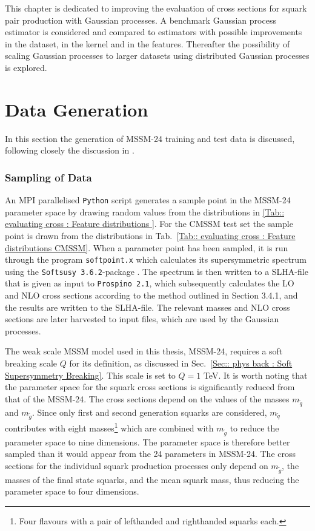 \documentclass[twoside,english]{uiofysmaster}
\begin{document}
{{This chapter is dedicated to improving the evaluation of cross sections for squark pair production with Gaussian processes. A benchmark Gaussian process estimator is considered and compared to estimators with possible improvements in the dataset, in the kernel and in the features. Thereafter the possibility of scaling Gaussian processes to larger datasets using distributed Gaussian processes is explored.

\section{Data Generation}

In this section the generation of MSSM-24 training and test data is discussed, following closely the discussion in \cite{sparre2018fast}. 

\subsubsection{Sampling of Data}

An MPI parallelised \verb|Python| script generates a sample point in the MSSM-24 parameter space by drawing random values from the distributions in \autoref{Tab:: evaluating cross : Feature distributions }. For the CMSSM test set the sample point is drawn from the distributions in Tab.~\ref{Tab:: evaluating cross : Feature distributions CMSSM}. When a parameter point has been sampled, it is run through the program \verb|softpoint.x| which calculates its supersymmetric spectrum using the \verb|Softsusy 3.6.2|-package \cite{ALLANACH2002305}. The spectrum is then written to a SLHA-file \cite{skands2004susy} that is given as input to \verb|Prospino 2.1|, which subsequently calculates the LO and NLO cross sections according to the method outlined in Section 3.4.1, and the results are written to the SLHA-file. The relevant masses and NLO cross sections are later harvested to input files, which are used by the Gaussian processes. 

The weak scale MSSM model used in this thesis, MSSM-24, requires a soft breaking scale $Q$ for its definition, as discussed in Sec.~\ref{Sec:: phys back : Soft Supersymmetry Breaking}. This scale is set to $Q=1$ TeV. It is worth noting that the parameter space for the squark cross sections is significantly reduced from that of the MSSM-24. The cross sections depend on the values of the masses $m_{\widetilde{q}}$ and $m_{\widetilde{g}}$. Since only first and second generation squarks are considered, $m_{\widetilde{q}}$ contributes with eight masses\footnote{Four flavours with a pair of lefthanded and righthanded squarks each.} which are combined with $m_{\widetilde{g}}$ to reduce the parameter space to nine dimensions. The parameter space is therefore better sampled than it would appear from the 24 parameters in MSSM-24. The cross sections for the individual squark production processes only depend on $m_{\widetilde{g}}$, the masses of the final state squarks, and the mean squark mass, thus reducing the parameter space to four dimensions.

}}
\end{document}
